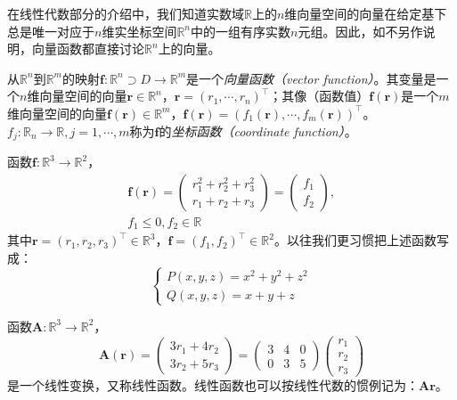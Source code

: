 \documentclass[main.tex]{subfiles}
\begin{document}
在线性代数部分的介绍中，我们知道实数域$\mathbb{R}$上的$n$维向量空间的向量在给定基下总是唯一对应于$n$维实坐标空间$\mathbb{R}^n$中的一组有序实数$n$元组。因此，如不另作说明，向量函数都直接讨论$\mathbb{R}^n$上的向量。

\begin{definition}[向量函数]\label{def:II.4.1}
    从$\mathbb{R}^n$到$\mathbb{R}^m$的映射$\mathbf{f}:\mathbb{R}^n\supset D\rightarrow\mathbb{R}^m$是一个\emph{向量函数（vector function）}。其变量是一个$n$维向量空间的向量$\mathbf{r}\in\mathbb{R}^n$，$\mathbf{r}=\left(r_1,\cdots,r_n\right)^\intercal$；其像（函数值）$\mathbf{f}\left(\mathbf{r}\right)$是一个$m$维向量空间的向量$\mathbf{f}\left(\mathbf{r}\right)\in\mathbb{R}^m$，$\mathbf{f}\left(\mathbf{r}\right)=\left(f_1\left(\mathbf{r}\right),\cdots,f_m\left(\mathbf{r}\right)\right)^\intercal$。$f_j:\mathbb{R}_n\rightarrow\mathbb{R},j=1,\cdots,m$称为$\mathbf{f}$的\emph{坐标函数（coordinate function）}。
\end{definition}

\begin{example}\label{exp:II.4.1}
    函数$\mathbf{f}:\mathbb{R}^3\rightarrow\mathbb{R}^2$，
    \[\begin{split}\mathbf{f}\left(\mathbf{r}\right)=\left(\begin{array}{c}r_1^2+r_2^2+r_3^2\\r_1+r_2+r_3\end{array}\right)=\left(\begin{array}{c}f_1\\f_2\end{array}\right),\\f_1\leq0,f_2\in\mathbb{R}\end{split}\]
    其中$\mathbf{r}=\left(r_1,r_2,r_3\right)^\intercal\in\mathbb{R}^3$，$\mathbf{f}=\left(f_1,f_2\right)^\intercal\in\mathbb{R}^2$。以往我们更习惯把上述函数写成：
    \[
        \left\{\begin{array}{l}
            P\left(x,y,z\right)=x^2+y^2+z^2 \\
            Q\left(x,y,z\right)=x+y+z
        \end{array}
        \right.
    \]
\end{example}

\begin{example}\label{exp:II.4.2}
    函数$\mathbf{A}:\mathbb{R}^3\rightarrow\mathbb{R}^2$，
    \[\mathbf{A}\left(\mathbf{r}\right)=\left(\begin{array}{c}3r_1+4r_2\\3r_2+5r_3\end{array}\right)=\left(\begin{array}{ccc}3&4&0\\0&3&5\end{array}\right)\left(\begin{array}{c}r_1\\r_2\\r_3\end{array}\right)\]
    是一个线性变换，又称线性函数。线性函数也可以按线性代数的惯例记为：$\mathbf{Ar}$。
\end{example}
\end{document}
